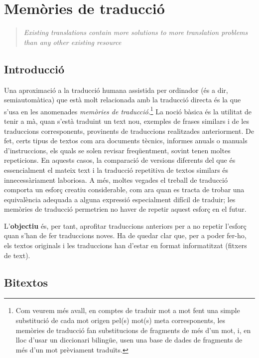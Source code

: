 \chapter{Memòries de traducció}
\label{se:memtrad}

\begin{quote}
  \textsl{Existing translations contain more solutions to more
    translation problems than any other existing resource}
  \citep{isabelle93p}
\end{quote}

\section{Introducció}

Una aproximació a la traducció humana assistida per ordinador (és a
dir, semiautomàtica) que està molt relacionada amb la traducció
directa és la que s'usa en les anomenades \emph{memòries de
  traducció}.\footnote{Com veurem més avall, en comptes de traduir mot
  a mot fent una simple substitució de cada mot origen pel(s) mot(s)
  meta corresponents, les memòries de traducció fan substitucions de
  fragments de més d'un mot, i, en lloc d'usar un diccionari bilingüe,
  usen una base de dades de fragments de més d'un mot prèviament
  traduïts.}  La noció bàsica \citep{somers96b,samuelson-brown96b} és
la utilitat de tenir a mà, quan s'està traduint un text nou, exemples
de frases similars i de les traduccions corresponents, provinents de
traduccions realitzades anteriorment. De fet, certs tipus de textos
com ara documents tècnics, informes anuals o manuals d'instruccions,
els quals se solen revisar freqüentment, sovint tenen moltes
repeticions. En aquests casos, la comparació de versions diferents del
que és essencialment el mateix text i la traducció repetitiva de
textos similars és innecessàriament laboriosa. A més, moltes vegades
el treball de traducció comporta un esforç creatiu considerable, com
ara quan es tracta de trobar una equivalència adequada a alguna
expressió especialment difícil de traduir; les memòries de traducció
permetrien no haver de repetir aquest esforç en el futur.

L'\textbf{objectiu} és, per tant, aprofitar traduccions anteriors per
a no repetir l'esforç quan s'han de fer traduccions noves. Ha de
quedar clar que, per a poder fer-ho, els textos originals i les
traduccions han d'estar en format informatitzat (fitxers de text).

\section{Bitextos}
\label{ss:bitextos}

